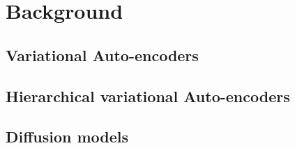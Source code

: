 \chapter{Background}
\label{sec:background}

\section{Variational Auto-encoders}
\section{Hierarchical variational Auto-encoders}
\section{Diffusion models}